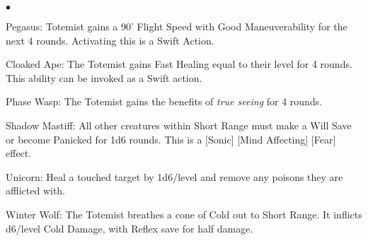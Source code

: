{\begin{list}{$\bullet$}{\itemspace}
\item Pegasus: Totemist gains a 90' Flight Speed with Good Maneuverability for the next 4 rounds. Activating this is a Swift Action.
\item Cloaked Ape: The Totemist gains Fast Healing equal to their level for 4 rounds. This ability can be invoked as a Swift action.
\item Phase Wasp: The Totemist gains the benefits of \emph{true seeing} for 4 rounds.
\item Shadow Mastiff: All other creatures within Short Range must make a Will Save or become Panicked for 1d6 rounds. This is a [Sonic] [Mind Affecting] [Fear] effect.
\item 
\item Unicorn: Heal a touched target by 1d6/level and remove any poisons they are afflicted with.
\item Winter Wolf: The Totemist breathes a cone of Cold out to Short Range. It inflicts d6/level Cold Damage, with Reflex save for half damage.
\end{list}}





